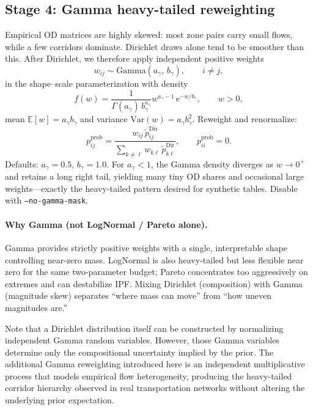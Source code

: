 \documentclass[11pt,a4paper]{report}
\begin{document}
\subsection{Stage 4: Gamma heavy-tailed reweighting}
\label{sec:ch1-gamma}

Empirical OD matrices are highly skewed: most zone pairs carry small flows, while a few corridors dominate. Dirichlet draws alone tend to be smoother than this. After Dirichlet, we therefore apply independent positive weights
\begin{equation}
    w_{ij} \sim \mathrm{Gamma}(a_{\gamma},\, b_{\gamma}),
    \qquad i\neq j,
    \label{eq:gamma_w}
\end{equation}
in the shape--scale parameterization with density
\begin{equation}
    f(w)
    = \frac{1}{\Gamma(a_{\gamma})\, b_{\gamma}^{a_{\gamma}}}
    w^{a_{\gamma}-1}\,\mathrm{e}^{-w/b_{\gamma}},
    \qquad w>0,
    \label{eq:gamma_pdf}
\end{equation}
mean $\mathbb{E}[w]=a_{\gamma}b_{\gamma}$ and variance $\mathrm{Var}(w)=a_{\gamma}b_{\gamma}^2$. Reweight and renormalize:
\begin{equation}
    p_{ij}^{\mathrm{prob}}
    = \frac{w_{ij}\,\tilde{p}_{ij}^{\mathrm{Dir}}}
           {\displaystyle\sum_{k\neq\ell} w_{k\ell}\,\tilde{p}_{k\ell}^{\mathrm{Dir}}},
    \qquad
    p_{ii}^{\mathrm{prob}}=0.
    \label{eq:gamma_reweight}
\end{equation}
Defaults: $a_{\gamma}=0.5$, $b_{\gamma}=1.0$. For $a_{\gamma}<1$, the Gamma density diverges as $w\to 0^+$ and retains a long right tail, yielding many tiny OD shares and occasional large weights---exactly the heavy-tailed pattern desired for synthetic tables. Disable with \texttt{--no-gamma-mask}.

\paragraph{Why Gamma (not LogNormal / Pareto alone).}
Gamma provides strictly positive weights with a single, interpretable shape controlling near-zero mass. LogNormal is also heavy-tailed but less flexible near zero for the same two-parameter budget; Pareto concentrates too aggressively on extremes and can destabilize IPF. Mixing Dirichlet (composition) with Gamma (magnitude skew) separates ``where mass can move'' from ``how uneven magnitudes are.''

Note that a Dirichlet distribution itself can be constructed by normalizing independent Gamma random variables. However, those Gamma variables determine only the compositional uncertainty implied by the prior. The additional Gamma reweighting introduced here is an independent multiplicative process that models empirical flow heterogeneity, producing the heavy-tailed corridor hierarchy observed in real transportation networks without altering the underlying prior expectation.
\end{document}
